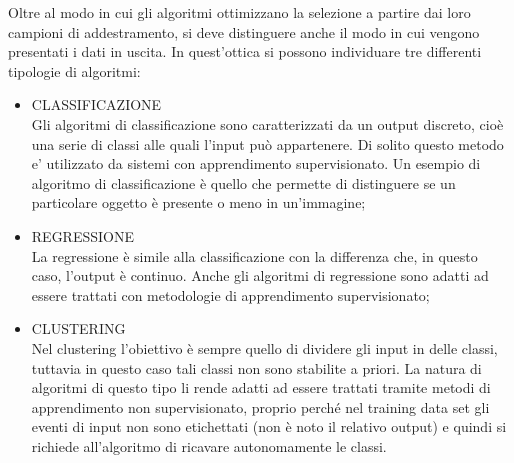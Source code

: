 Oltre al modo in cui gli algoritmi ottimizzano la selezione a partire dai loro campioni di addestramento, si deve distinguere anche il modo in cui vengono presentati i dati in uscita. In quest'ottica si possono individuare tre differenti tipologie di algoritmi:
\begin{itemize}
	
	\item CLASSIFICAZIONE \\
	Gli algoritmi di classificazione sono caratterizzati da un output discreto, cioè una serie di classi alle quali l'input può appartenere. Di solito questo metodo e' utilizzato da sistemi con apprendimento supervisionato. Un esempio di algoritmo di classificazione è quello che permette di distinguere se un particolare oggetto è presente o meno in un'immagine;
	
	\item REGRESSIONE \\
	La regressione è simile alla classificazione con la differenza che, in questo caso, l'output è continuo. Anche gli algoritmi di regressione sono adatti ad essere trattati con metodologie di apprendimento supervisionato;
	
	\item CLUSTERING \\
	Nel clustering l'obiettivo è sempre quello di dividere gli input in delle classi, tuttavia in questo caso tali classi non sono stabilite a priori. La natura di algoritmi di questo tipo li rende adatti ad essere trattati tramite metodi di apprendimento non supervisionato, proprio perché nel training data set gli eventi di input non sono etichettati (non è noto il relativo output) e quindi si richiede all'algoritmo di ricavare autonomamente le classi.
	
\end{itemize}


